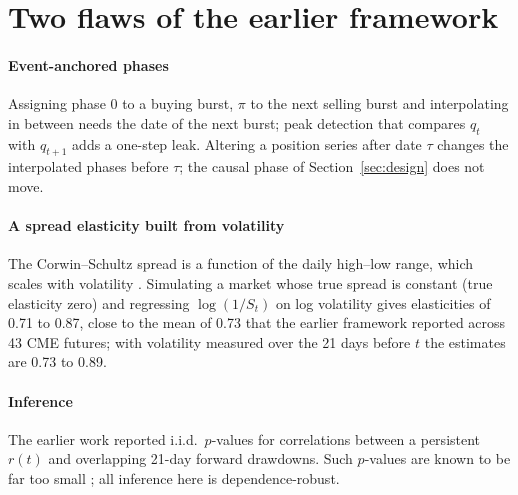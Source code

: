 \documentclass[preprint,12pt,authoryear]{elsarticle}
\begin{document}
\appendix
\section{Two flaws of the earlier framework}
\label{app:earlier}

\paragraph{Event-anchored phases} Assigning phase 0 to a buying burst, $\pi$
to the next selling burst and interpolating in between needs the date of the
next burst; peak detection that compares $q_t$ with $q_{t+1}$ adds a one-step
leak. Altering a position series after date $\tau$ changes the interpolated
phases before $\tau$; the causal phase of Section~\ref{sec:design} does not
move.

\paragraph{A spread elasticity built from volatility} The Corwin--Schultz
spread is a function of the daily high--low range, which scales with
volatility \citep{AbdiRanaldo2017}. Simulating a market whose true spread is
constant (true elasticity zero) and regressing $\log(1/S_t)$ on log
volatility gives elasticities of 0.71 to 0.87, close to the mean of 0.73
that the earlier framework reported across 43 CME futures; with volatility measured over the
21 days before $t$ the estimates are 0.73 to 0.89.

\paragraph{Inference} The earlier work reported i.i.d.\ $p$-values for
correlations between a persistent $r(t)$ and overlapping 21-day forward
drawdowns. Such $p$-values are known to be far too small
\citep{HansenHodrick1980,Valkanov2003}; all inference here is
dependence-robust.
\end{document}
